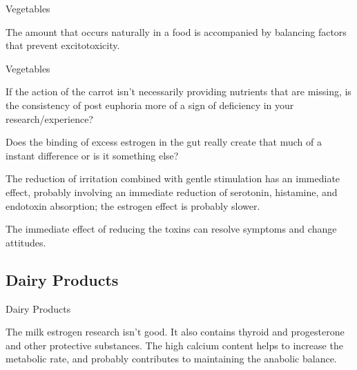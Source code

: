 \documentclass[11pt,oneside,openany,extrafontsizes]{memoir}
\begin{document}
\begin{standalonequote}{Vegetables}

    \begin{answer}
       The amount that occurs naturally in a food is accompanied by balancing factors that prevent excitotoxicity. 
    \end{answer}
\end{standalonequote}

\begin{qaexchange}{Vegetables}

    \begin{question}
        If the action of the carrot isn't necessarily providing nutrients that are missing, is the consistency of post euphoria more of a sign of deficiency in your research/experience?

         Does the binding of excess estrogen in the gut really create that much of a instant difference or is it something else?
    \end{question}

    \begin{answer}
      The reduction of irritation combined with gentle stimulation has an immediate effect, probably involving an immediate reduction of serotonin, histamine, and endotoxin absorption; the estrogen effect is probably slower.

      The immediate effect of reducing the toxins can resolve symptoms and change attitudes.
    \end{answer}
\end{qaexchange}

\subsection{Dairy Products}

\begin{standalonequote}{Dairy Products}

    \begin{answer}
        The milk estrogen research isn't good. It also contains thyroid and progesterone and other protective substances. The high calcium content helps to increase the metabolic rate, and probably contributes to maintaining the anabolic balance.
    \end{answer}
\end{standalonequote}
\end{document}
